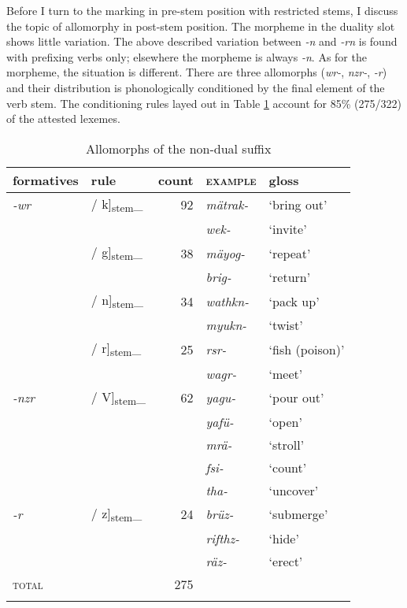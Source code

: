 Before I turn to the  marking in pre-stem position with restricted stems, I discuss the topic of allomorphy in post-stem position. The  morpheme in the duality slot shows little variation. The above described variation between \emph{-n} and \emph{-rn} is found with prefixing verbs only; elsewhere the  morpheme is always \emph{-n}. As for the  morpheme, the situation is different. There are three allomorphs (\emph{wr-}, \emph{nzr-}, \emph{-r}) and their distribution is phonologically conditioned by the final element of the verb stem. The conditioning rules layed out in Table \ref{allonondual} account for 85\% (275/322) of the attested  lexemes.

\begin{table}
	\caption{Allomorphs of the non-dual suffix}
	\label{allonondual}
\begin{tabularx}{.8\textwidth}{llrXl}
	\lsptoprule
	{formatives} & {rule} &{count}& {\textsc{example}}& {gloss}\\
	\midrule
	\emph{-wr}& / k]\textsubscript{\tiny{stem}}\_&92& \emph{mätrak-}& `bring out'\\
	&&& \emph{wek-}&`invite'\\
	& / g]\textsubscript{\tiny{stem}}\_	&38& \emph{mäyog-}& `repeat'\\
	&&& \emph{brig-}&`return'\\
	& / n]\textsubscript{\tiny{stem}}\_	&34& \emph{wathkn-}& `pack up'\\
	&&& \emph{myukn-}&`twist'\\
	& / r]\textsubscript{\tiny{stem}}\_	&25& \emph{rsr-}& `fish (poison)'\\
	&&& \emph{wagr-}&`meet'\\\midrule
	\emph{-nzr}	& / V]\textsubscript{\tiny{stem}}\_&62& \emph{yagu-}& `pour out'\\
	&&& \emph{yafü-}& `open'\\
	&&& \emph{mrä-}& `stroll'\\
	&&& \emph{fsi-}& `count'\\
	&&& \emph{tha-}& `uncover'\\\midrule
	\emph{-r}& / z]\textsubscript{\tiny{stem}}\_&24& \emph{brüz-}& `submerge'\\
	&&& \emph{rifthz-}& `hide'\\
	&&& \emph{räz-}& `erect'\\\midrule
	\textsc{total}&&275&&\\
	\lspbottomrule
\end{tabularx}%
\end{table}



